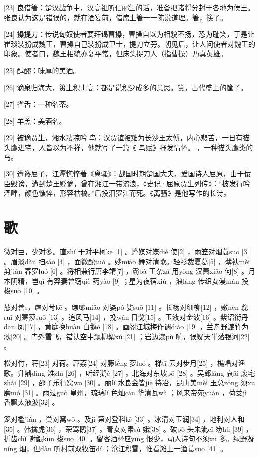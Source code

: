 \documentclass[12pt,UTF8]{ctexbook}
\begin{document}
[23] 良借箸：楚汉战争中，汉高祖听信郦生的话，准备把诸将分封于各地为侯王。张良认为这是错误的，就在酒宴前，借席上箸一一陈说道理。箸，筷子。

[24] 操提刀：传说匈奴使者要拜谒曹操，曹操自以为相貌不扬，恐为耻笑，于是让崔琰装扮成魏王，曹操自己装扮成卫士，提刀立旁。朝见后，让人问使者对魏王的印象。使者曰，魏王相貌亦复平常，但床头捉刀人（指曹操）乃真英雄。

[25] 醇醪：味厚的美酒。

[26] 滴泉归海大，篑土积山高：都是说积少成多的意思。篑，古代盛土的筐子。

[27] 雀舌：一种名茶。

[28] 羊羔：美酒名。

[29] 被谪贾生，湘水凄凉吟 鸟：汉贾谊被黜为长沙王太傅，内心悲苦，一日有猫头鹰进宅，人皆以为不祥，他就写了一篇《 鸟赋》抒发情怀。 ，一种猫头鹰类的鸟。

[30] 遭谗屈子，江潭憔悴著《离骚》：战国时期楚国大夫、爱国诗人屈原，由于佞臣毁谤，遭到楚王贬谪，曾在湘江一带流浪，《史记·屈原贾生列传》：“披发行吟泽畔，颜色憔悴，形容枯槁。”后投汩罗江而死。《离骚》是他写作的长诗。





\chapter{歌}


微对巨，少对多。直zhí 干对平柯kē [1] 。蜂媒对蝶dié 使[2] ，雨笠对烟蓑suō [3] 。眉淡dàn 扫sǎo [4] ，面微酡tuó 。妙miào 舞对清歌。轻衫裁夏葛[5] ，薄袂mèi 剪jiǎn 春罗luó [6] 。将相兼行唐李靖[7] ，霸bà 王杂zá 用yòng 汉萧xiāo 何[8] 。月本阴精，岂qǐ 有羿妻曾窃qiè 药yào [9] ；星为夜宿xiù ，浪làng 传织女漫màn 投梭suō [10] 。

慈对善s，虐对苛kē 。缥缈miǎo 对婆pó 娑suō [11] 。长杨对细柳[12] ，嫩nèn 蕊ruǐ 对寒莎suō [13] 。追风马[14] ，挽wǎn 日戈[15] 。玉液对金波[16] 。紫诏衔丹dān 凤[17] ，黄庭换huàn 白鹅é [18] 。画阁江城梅作调diào [19] ，兰舟野渡竹为歌[20] 。门外雪飞，错认空中飘柳絮xù [21] ；岩边瀑pù 响，误疑天半落银河[22] 。

松对竹，荇[23] 对荷。薜荔[24] 对藤téng 萝luó 。梯tī 云对步月[25] ，樵唱对渔歌。升鼎dǐng 雉zhì [26] ，听经鹅é [27] 。北海对东坡pō [28] 。吴郎láng 哀āi 废宅zhái [29] ，邵子乐行窝wō [30] 。丽lí 水良金皆jiē 待冶，昆山美měi 玉总zǒng 须xū 磨mó [31] 。雨过guò 皇州，琉璃lí 色灿càn 华清瓦wǎ ；风来帝苑yuàn ，荷芰jì 香飘太液波[32] 。

笼对槛jiàn ，巢对窝wō 。及jí 第对登科kē [33] 。冰清对玉润[34] ，地利对人和[35] 。韩擒虎[36] ，荣驾鹅[37] 。青女对素sù 娥[38] 。破pò 头朱泚cǐ 笏hù [39] ，折齿chǐ 谢鲲kūn 梭suō [40] 。留客酒杯应yīng 恨少，动人诗句不须xū 多。绿野凝níng 烟，但dàn 听村前双牧笛dí ；沧江积雪，惟看滩上一渔蓑suō [41] 。
\end{document}

